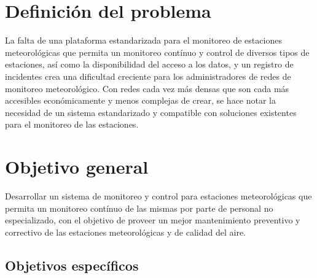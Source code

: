 \section{Definición del problema}

La falta de una plataforma estandarizada para el monitoreo de estaciones meteorológicas que permita un monitoreo contínuo y control de diversos tipos de estaciones, así como la disponibilidad del acceso a los datos, y un registro de incidentes crea una dificultad creciente para los administradores de redes de monitoreo meteorológico. Con redes cada vez más densas que son cada más accesibles económicamente y menos complejas de crear, se hace notar la necesidad de un sistema estandarizado y compatible con soluciones existentes para el monitoreo de las estaciones.



\section{Objetivo general}

Desarrollar un sistema de monitoreo y control para estaciones meteorológicas que permita un monitoreo contínuo de las mismas por parte de personal no especializado, con el objetivo de proveer un mejor mantenimiento preventivo y correctivo de las estaciones meteorológicas y de calidad del aire.





\subsection{Objetivos específicos}


